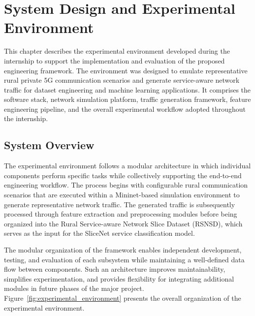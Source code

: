 \documentclass[12pt,a4paper]{report}
\begin{document}
	\chapter{System Design and Experimental Environment}
	\label{chap:experimental_environment}
	
	This chapter describes the experimental environment developed during the internship to support the implementation and evaluation of the proposed engineering framework. The environment was designed to emulate representative rural private 5G communication scenarios and generate service-aware network traffic for dataset engineering and machine learning applications. It comprises the software stack, network simulation platform, traffic generation framework, feature engineering pipeline, and the overall experimental workflow adopted throughout the internship.
	
	\section{System Overview}
	\label{sec:system_overview}
	
	The experimental environment follows a modular architecture in which individual components perform specific tasks while collectively supporting the end-to-end engineering workflow. The process begins with configurable rural communication scenarios that are executed within a Mininet-based simulation environment to generate representative network traffic. The generated traffic is subsequently processed through feature extraction and preprocessing modules before being organized into the Rural Service-aware Network Slice Dataset (RSNSD), which serves as the input for the SliceNet service classification model.
	
	The modular organization of the framework enables independent development, testing, and evaluation of each subsystem while maintaining a well-defined data flow between components. Such an architecture improves maintainability, simplifies experimentation, and provides flexibility for integrating additional modules in future phases of the major project. Figure~\ref{fig:experimental_environment} presents the overall organization of the experimental environment.
	
\end{document}
